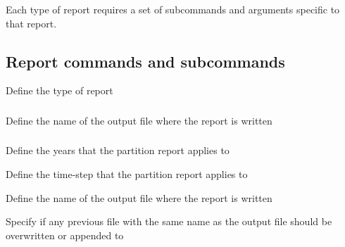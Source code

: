 Each type of report requires a set of subcommands and arguments specific to that report.

\subsection{Report commands and subcommands}


 {Define the type of report}

\subsubsection[Print the spatial co-ordinates of each spatial cell (i.e., row and column labels of each spatial cell) of the spatial structure]{}

 {Define the name of the output file where the report is written}

\subsubsection[Print the partition]{}

 {Define the years that the partition report applies to}

 {Define the time-step that the partition report applies to}

 {Define the name of the output file where the report is written}

 {Specify if any previous file with the same name as the output file should be overwritten or appended to}

\subsubsection[Print the partition at initialisation]{}

